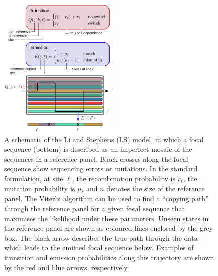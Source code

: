 \documentclass[12pt,letterpaper]{article}
\begin{document}
\begin{figure} \centering
\includegraphics[width=0.5\textwidth]{LS_model_schematic}
\caption{\label{fig:ls_diagram} A schematic of the Li and Stephens (LS)
model, in which a focal sequence (bottom) is described as an
imperfect mosaic of the sequences in a reference panel.
Black crosses along the focal sequence show sequencing
errors or mutations.
In the standard formulation, at site $\ell$, the recombination probability is $r_\ell$,
the mutation probability is $\mu_\ell$ and $n$
denotes the size of the reference panel.
The Viterbi algorithm can be used to find a
``copying path'' through the reference panel for a given focal sequence that
maximises the likelihood under these parameters. Unseen states in the reference panel are shown as coloured lines enclosed by
the grey box. The black arrow describes the true path through the data which leads to the emitted
focal sequence below. Examples of transition and
emission probabilities along this trajectory are shown by the red and blue
arrows, respectively.
}
\end{figure}
\end{document}
